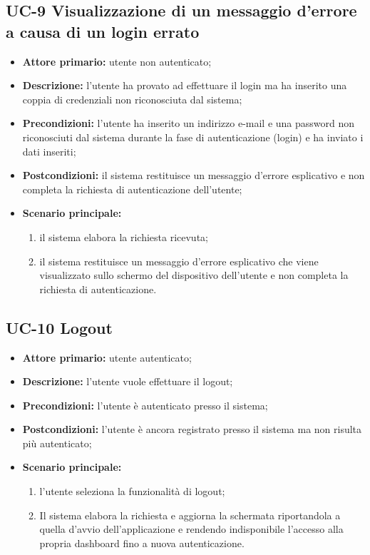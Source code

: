 \subsection{UC-9 Visualizzazione di un messaggio d'errore a causa di un login errato}
\begin{itemize}
	\item \textbf{Attore primario:} utente non autenticato;

	\item \textbf{Descrizione:} l'utente ha provato ad effettuare il login ma ha inserito una coppia di credenziali non riconosciuta dal sistema;

	\item \textbf{Precondizioni:} l'utente ha inserito un indirizzo e-mail e una password non riconosciuti dal sistema durante la fase di autenticazione (login) e ha inviato i dati inseriti;

	\item \textbf{Postcondizioni:} il sistema restituisce un messaggio d'errore esplicativo e non completa la richiesta di autenticazione dell'utente;

	\item \textbf{Scenario principale:}

	      \begin{enumerate}
		      \item il sistema elabora la richiesta ricevuta;
		      \item il sistema restituisce un messaggio d'errore esplicativo che viene visualizzato sullo schermo del dispositivo dell'utente e non completa la richiesta di autenticazione.
	      \end{enumerate}
\end{itemize}
\subsection{UC-10 Logout}
\begin{itemize}
	\item \textbf{Attore primario:} utente autenticato;

	\item \textbf{Descrizione:} l'utente vuole effettuare il logout;

	\item \textbf{Precondizioni:} l'utente è autenticato presso il sistema;

	\item \textbf{Postcondizioni:} l'utente è ancora registrato presso il sistema ma non risulta più autenticato;

	\item \textbf{Scenario principale:}

	      \begin{enumerate}
		      \item l'utente seleziona la funzionalità di logout;
		      \item Il sistema elabora la richiesta e aggiorna la schermata riportandola a quella d'avvio dell'applicazione e rendendo indisponibile l'accesso alla propria dashboard fino a nuova autenticazione.
	      \end{enumerate}
\end{itemize}
